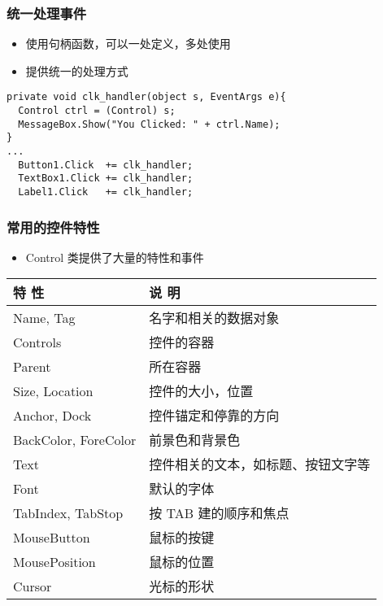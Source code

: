 \begin{frame}[fragile]
\frametitle{统一处理事件}
\begin{itemize}
\item 使用句柄函数，可以一处定义，多处使用
\item 提供统一的处理方式
\end{itemize}
\begin{lstlisting}
private void clk_handler(object s, EventArgs e){
  Control ctrl = (Control) s;
  MessageBox.Show("You Clicked: " + ctrl.Name);
}
...
  Button1.Click  += clk_handler;
  TextBox1.Click += clk_handler;
  Label1.Click   += clk_handler;
\end{lstlisting}
\end{frame}


\begin{frame}
\frametitle{常用的控件特性}
\begin{itemize}
\item Control 类提供了大量的特性和事件
\end{itemize}
\begin{tabular}{l|l}
\hline
特 性                & 说 明                              \\
\hline
Name, Tag            & 名字和相关的数据对象               \\
Controls             & 控件的容器                         \\
Parent               & 所在容器                           \\
\hline
Size, Location       & 控件的大小，位置                   \\
Anchor, Dock         & 控件锚定和停靠的方向               \\
BackColor, ForeColor & 前景色和背景色                     \\
\hline
Text                 & 控件相关的文本，如标题、按钮文字等 \\
Font                 & 默认的字体                         \\
\hline
TabIndex, TabStop    & 按 TAB 建的顺序和焦点             \\
MouseButton          & 鼠标的按键                         \\
MousePosition        & 鼠标的位置                         \\
Cursor               & 光标的形状                         \\
\hline
\end{tabular}
\end{frame}

